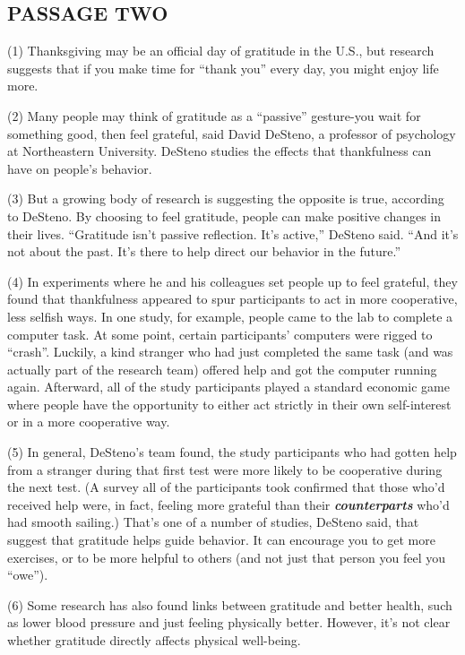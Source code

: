 \documentclass[UTF8,11pt]{ctexart}
\begin{document}
\subsection*{\textbf{PASSAGE TWO}}


(1) Thanksgiving may be an official day of gratitude in the U.S., but research suggests that if you make time for “thank you” every day, you might enjoy life more.


(2) Many people may think of gratitude as a “passive” gesture-you wait for something good, then feel grateful, said David DeSteno, a professor of psychology at Northeastern University. DeSteno studies the effects that thankfulness can have on people’s behavior.


(3) But a growing body of research is suggesting the opposite is true, according to DeSteno. By choosing to feel gratitude, people can make positive changes in their lives. “Gratitude isn’t passive reflection. It’s active,” DeSteno said. “And it’s not about the past. It’s there to help direct our behavior in the future.”


(4) In experiments where he and his colleagues set people up to feel grateful, they found that thankfulness appeared to spur participants to act in more cooperative, less selfish ways. In one study, for example, people came to the lab to complete a computer task. At some point, certain participants’ computers were rigged to “crash”. Luckily, a kind stranger who had just completed the same task (and was actually part of the research team) offered help and got the computer running again. Afterward, all of the study participants played a standard economic game where people have the opportunity to either act strictly in their own self-interest or in a more cooperative way.


(5) In general, DeSteno’s team found, the study participants who had gotten help from a stranger during that first test were more likely to be cooperative during the next test. (A survey all of the participants took confirmed that those who’d received help were, in fact, feeling more grateful than their \textbf{\textit{counterparts}} who’d had smooth sailing.) That’s one of a number of studies, DeSteno said, that suggest that gratitude helps guide behavior. It can encourage you to get more exercises, or to be more helpful to others (and not just that person you feel you “owe”).


(6) Some research has also found links between gratitude and better health, such as lower blood pressure and just feeling physically better. However, it’s not clear whether gratitude directly affects physical well-being.
\end{document}
